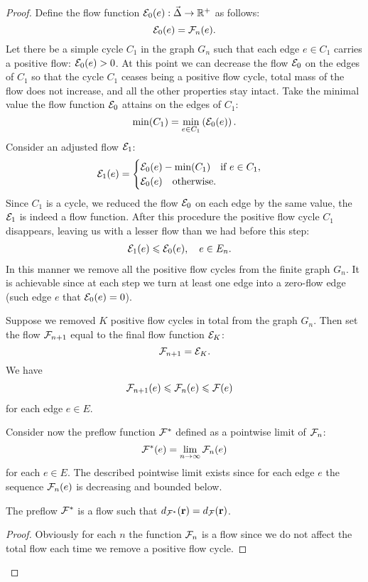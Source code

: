 \documentclass[12pt]{amsart}
\begin{document}
\begin{proof}
      Define the flow function $\cal{E}_0(e): \onet \to \mathbb{R}^{+}$ as follows:
      \[
        \cal{E}_0(e) = \flowposn{n}(e).
      \]
      Let there be a simple cycle $C_1$ in the graph $G_n$ such that each edge $e \in C_1$ carries
        a positive flow: $\cal{E}_0(e) > 0$.
      At this point we can decrease the flow $\cal{E}_0$ on the edges of $C_1$ so that the cycle $C_1$
        ceases being a positive flow cycle, total mass of the flow does not increase, and all the other properties stay intact.
      Take the minimal value the flow function $\cal{E}_0$ attains on the edges of $C_1$:
        \[
          \min(C_1) = \min_{e \in C_1}\left(\cal{E}_0(e)\right).
        \]
      Consider an adjusted flow $\cal{E}_1$:
      \begin{equation*}
        \cal{E}_1(e) =
        \begin{cases}
          \cal{E}_0(e) - \min(C_1) \quad \text{if } e \in C_1,\\
          \cal{E}_0(e) \quad \text{otherwise}.
        \end{cases}
      \end{equation*}
      Since $C_1$ is a cycle, we reduced the flow $\cal{E}_0$ on each edge by the same value,
        the $\cal{E}_1$ is indeed a flow function.
      After this procedure the positive flow cycle $C_1$ disappears,
        leaving us with a lesser flow than we had before this step:
      \begin{align*}
        &\cal{E}_1(e) \leq \cal{E}_0(e), \quad e \in E_n.
      \end{align*}
      In this manner we remove all the positive flow cycles from the finite graph $G_n$.
      It is achievable since at each step we turn at least one edge into a zero-flow edge (such edge $e$ that $\cal{E}_0(e) = 0$).

      Suppose we removed $K$ positive flow cycles in total from the graph $G_n$.
      Then set the flow $\flowposn{n+1}$ equal to the final flow function $\cal{E}_K$:
      \[
        \flowposn{n+1} = \cal{E}_K.
      \]
      We have
      \begin{align*}
        &\flowposn{n+1}(e) \leq \flowposn{n}(e) \leq \flowpos(e)
      \end{align*}
        for each edge $e \in E$.

      Consider now the preflow function $\preflow$ defined as a pointwise limit of $\flowposn{n}$:
      \[
        \preflow(e) = \lim_{n \to \infty} \flowposn{n}(e)
      \]
        for each $e \in E$.
      The described pointwise limit exists since for each edge $e$ the sequence $\flowposn{n}(e)$ is decreasing and bounded below.
      \begin{prop}
        The preflow $\preflow$ is a flow such that $d_{\preflow}(\root) = d_{\flowpos}(\root)$.
      \end{prop}
      \begin{proof}
        Obviously for each $n$ the function $\flowposn{n}$ is a flow since we do not affect the total flow each time we remove a positive flow cycle.


\end{proof}
\end{proof}
\end{document}
